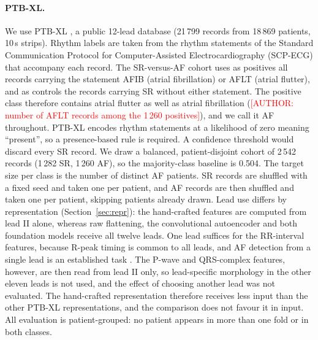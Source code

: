 \documentclass[preprint,11pt]{elsarticle}
\begin{document}
\paragraph{PTB-XL.} We use PTB-XL \cite{ptbxl2020,ptbxl2022physionet}, a public 12-lead database
(21\,799 records from 18\,869 patients, 10\,s strips). Rhythm labels are taken from the
rhythm statements of the Standard Communication Protocol for Computer-Assisted
Electrocardiography (SCP-ECG) that accompany each record. The SR-versus-AF cohort uses as
positives all records carrying the statement AFIB (atrial fibrillation) or AFLT (atrial
flutter), and as controls the records carrying SR without either statement. The positive
class therefore contains atrial flutter as well as atrial fibrillation
(\textcolor{red}{[AUTHOR: number of AFLT records among the 1\,260 positives]}), and we call
it AF throughout. PTB-XL encodes rhythm statements at a likelihood of zero meaning
``present'', so a presence-based rule is required. A confidence threshold would discard
every SR record. We draw a balanced, patient-disjoint cohort of 2\,542 records (1\,282 SR,
1\,260 AF), so the majority-class baseline is 0.504. The target size per class is the
number of distinct AF patients. SR records are shuffled with a fixed seed and taken one
per patient, and AF records are then shuffled and taken one per patient, skipping
patients already drawn. Lead use differs by representation (Section~\ref{sec:repr}): the
hand-crafted features are computed from lead II alone, whereas raw flattening, the
convolutional autoencoder and both foundation models receive all twelve leads. One lead
suffices for the RR-interval features, because R-peak timing is common to all leads, and
AF detection from a single lead is an established task \cite{clifford2017af}. The P-wave
and QRS-complex features, however, are then read from lead II only, so lead-specific morphology in
the other eleven leads is not used, and the effect of choosing another lead was not
evaluated. The hand-crafted representation therefore receives less input than the other
PTB-XL representations, and the comparison does not favour it in input. All evaluation is
patient-grouped: no patient appears in more than one fold or in both classes.
\end{document}
